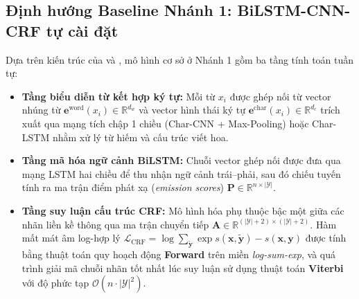 \subsection{Định hướng Baseline Nhánh 1: BiLSTM-CNN-CRF tự cài đặt}
Dựa trên kiến trúc của \citet{lample-etal-2016-neural} và \citet{ma-hovy-2016-end}, mô hình cơ sở ở Nhánh 1 gồm ba tầng tính toán tuần tự:
\begin{itemize}
    \item \textbf{Tầng biểu diễn từ kết hợp ký tự:} Mỗi từ $x_i$ được ghép nối từ vector nhúng từ $\mathbf{e}^{\text{word}}(x_i) \in \mathbb{R}^{d_w}$ và vector hình thái ký tự $\mathbf{e}^{\text{char}}(x_i) \in \mathbb{R}^{d_c}$ trích xuất qua mạng tích chập 1 chiều (Char-CNN + Max-Pooling) hoặc Char-LSTM nhằm xử lý từ hiếm và cấu trúc viết hoa.
    \item \textbf{Tầng mã hóa ngữ cảnh BiLSTM:} Chuỗi vector ghép nối được đưa qua mạng LSTM hai chiều để thu nhận ngữ cảnh trái--phải, sau đó chiếu tuyến tính ra ma trận điểm phát xạ (\textit{emission scores}) $\mathbf{P} \in \mathbb{R}^{n \times |\mathcal{Y}|}$.
    \item \textbf{Tầng suy luận cấu trúc CRF:} Mô hình hóa phụ thuộc bậc một giữa các nhãn liền kề thông qua ma trận chuyển tiếp $\mathbf{A} \in \mathbb{R}^{(|\mathcal{Y}|+2) \times (|\mathcal{Y}|+2)}$. Hàm mất mát âm log-hợp lý $\mathcal{L}_{\text{CRF}} = \log \sum_{\tilde{\mathbf{y}}} \exp s(\mathbf{x}, \tilde{\mathbf{y}}) - s(\mathbf{x}, \mathbf{y})$ được tính bằng thuật toán quy hoạch động \textbf{Forward} trên miền \textit{log-sum-exp}, và quá trình giải mã chuỗi nhãn tốt nhất lúc suy luận sử dụng thuật toán \textbf{Viterbi} với độ phức tạp $\mathcal{O}(n \cdot |\mathcal{Y}|^2)$.
\end{itemize}
